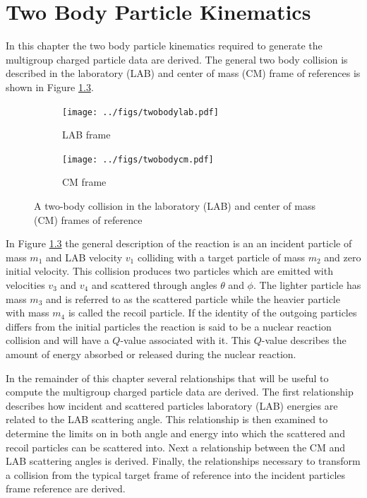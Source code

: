 \documentclass[../main.tex]{subfiles}
\begin{document}
\chapter{Two Body Particle Kinematics}
In this chapter the two body particle kinematics required to generate the multigroup charged particle data are derived. The general two body collision is described in the laboratory (LAB) and center of mass (CM) frame of references is shown in Figure \ref{fig:two-body-figure}. 
\begin{figure}[!htb]
  \centering
  \begin{subfigure}{.45\textwidth}
    \centering
    \texttt{[image: ../figs/twobodylab.pdf]}
    \caption{LAB frame}
    \label{fig:lab-fom}
  \end{subfigure}%
  \begin{subfigure}{.45\textwidth}
    \centering
    \texttt{[image: ../figs/twobodycm.pdf]}
    \caption{CM frame}
    \label{fig:cm-fom}
  \end{subfigure}
  \caption{A two-body collision in the laboratory (LAB) and center of mass (CM) frames of reference}
  \label{fig:two-body-figure}
\end{figure}
In Figure \ref{fig:two-body-figure} the general description of the reaction is an an incident particle of mass $m_1$ and LAB velocity $v_1$ colliding with a target particle of mass $m_2$ and zero initial velocity. This collision produces two particles which are emitted with velocities $v_3$ and $v_4$ and scattered through angles $\theta$ and $\phi$. The lighter particle has mass $m_3$ and is referred to as the scattered particle while the heavier particle with mass $m_4$ is called the recoil particle. If the identity of the outgoing particles differs from the initial particles the reaction is said to be a nuclear reaction collision and will have a $Q$-value associated with it. This $Q$-value describes the amount of energy absorbed or released during the nuclear reaction.

In the remainder of this chapter several relationships that will be useful to compute the multigroup charged particle data are derived. The first relationship describes how incident and scattered particles laboratory (LAB) energies are related to the LAB scattering angle. This relationship is then examined to determine the limits on in both angle and energy into which the scattered and recoil particles can be scattered into. Next a relationship between the CM and LAB scattering angles is derived. Finally, the relationships necessary to transform a collision from the typical target frame of reference into the incident particles frame reference are derived.
\end{document}
